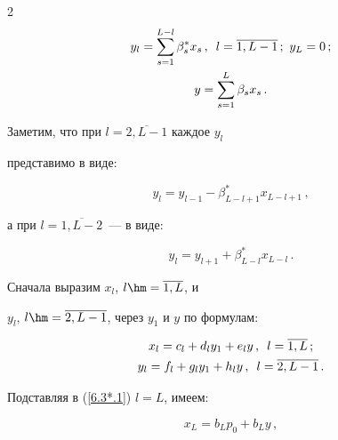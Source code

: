 \begin{multicols}{2}
\begin{gather}
y_l = \sum\limits_{s=1}^{L-l} \beta^*_s x_s \,,\enskip l=\overline{1,L-1}\,;


\ y_{L} = 0\,;


\\


\label{6.3*.3}


y= \sum\limits_{s=1}^{L} \beta_s x_s \,.


\end{gather}


Заметим, что при $l=\overline{2,L-1}$ каждое $y_l$


представимо в виде:


\begin{equation}


\label{6.3*.4}


y_l = y_{l-1} - \beta^*_{L-l+1} x_{L-l+1}\,,


\end{equation}


а при $l=\overline{1,L-2}$~--- в виде:


\begin{equation}


\label{6.3*.5}


y_l = y_{l+1} + \beta^*_{L-l} x_{L-l}\,.


\end{equation}





Сначала выразим $x_l$, $l\hm=\overline{1,L}$, и


$y_l$,  $l\hm=\overline{2,L-1}$, через $y_1$ и $y$ по формулам:




\begin{gather*}


x_{l} = c_l + d_l y_1 + e_l y \,,\enskip l=\overline{1,L}\,;


\\


y_{l} = f_l + g_l y_1 + h_l y \,,\enskip l=\overline{2,L-1}\,.


\end{gather*}




Подставляя в (\ref{6.3*.1}) $l=L$, имеем:




\begin{equation*}


x_{L} = b_L p_0 + b_L y \,,



\end{equation*}
\end{multicols}
